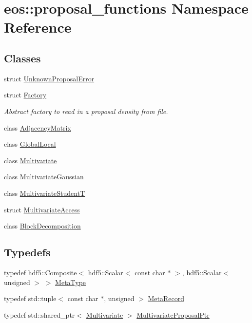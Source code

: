 \hypertarget{namespaceeos_1_1proposal__functions}{
\section{eos::proposal\_\-functions Namespace Reference}
\label{namespaceeos_1_1proposal__functions}
}
\subsection*{Classes}
\begin{DoxyCompactItemize}
\item 
struct \hyperlink{structeos_1_1proposal__functions_1_1UnknownProposalError}{UnknownProposalError}
\item 
struct \hyperlink{structeos_1_1proposal__functions_1_1Factory}{Factory}
\begin{DoxyCompactList}\small\item\em Abstract factory to read in a proposal density from file. \item\end{DoxyCompactList}\item 
class \hyperlink{classeos_1_1proposal__functions_1_1AdjacencyMatrix}{AdjacencyMatrix}
\item 
class \hyperlink{classeos_1_1proposal__functions_1_1GlobalLocal}{GlobalLocal}
\item 
class \hyperlink{classeos_1_1proposal__functions_1_1Multivariate}{Multivariate}
\item 
class \hyperlink{classeos_1_1proposal__functions_1_1MultivariateGaussian}{MultivariateGaussian}
\item 
class \hyperlink{classeos_1_1proposal__functions_1_1MultivariateStudentT}{MultivariateStudentT}
\item 
struct \hyperlink{structeos_1_1proposal__functions_1_1MultivariateAccess}{MultivariateAccess}
\item 
class \hyperlink{classeos_1_1proposal__functions_1_1BlockDecomposition}{BlockDecomposition}
\end{DoxyCompactItemize}
\subsection*{Typedefs}
\begin{DoxyCompactItemize}
\item 
typedef \hyperlink{classeos_1_1hdf5_1_1Composite}{hdf5::Composite}$<$ \hyperlink{classeos_1_1hdf5_1_1Scalar}{hdf5::Scalar}$<$ const char $\ast$ $>$, \hyperlink{classeos_1_1hdf5_1_1Scalar}{hdf5::Scalar}$<$ unsigned $>$ $>$ \hyperlink{namespaceeos_1_1proposal__functions_ad45af5ebbbdc545b033b153cafe7e360}{MetaType}
\item 
typedef std::tuple$<$ const char $\ast$, unsigned $>$ \hyperlink{namespaceeos_1_1proposal__functions_a7b9711fcd1f76e034c72073e2d5d7f15}{MetaRecord}
\item 
typedef std::shared\_\-ptr$<$ \hyperlink{classeos_1_1proposal__functions_1_1Multivariate}{Multivariate} $>$ \hyperlink{namespaceeos_1_1proposal__functions_a6cffa18d523cd6955629beabbe07c17c}{MultivariateProposalPtr}
\end{DoxyCompactItemize}

